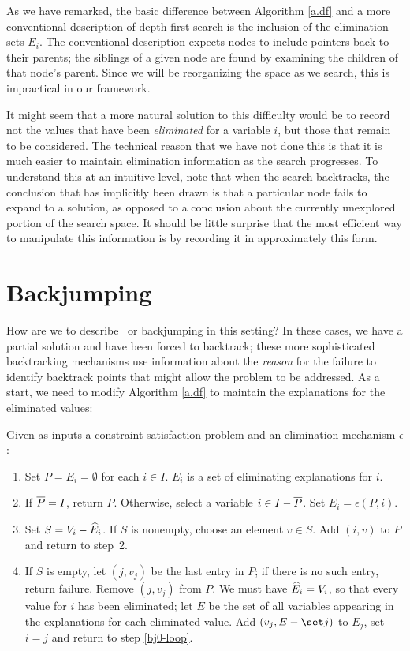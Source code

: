 As we have remarked, the basic difference between Algorithm \ref{a.df}
and a more conventional description of depth-first search is the
inclusion of the elimination sets $E_i$.  The conventional description
expects nodes to include pointers back to their parents; the siblings
of a given node are found by examining the children of that node's
parent.  Since we will be reorganizing the space as we search, this is
impractical in our framework.

It might seem that a more natural solution to this difficulty would be
to record not the values that have been {\em eliminated\/} for a
variable $i$, but those that remain to be considered.  The technical
reason that we have not done this is that it is much easier to
maintain elimination information as the search progresses.  To
understand this at an intuitive level, note that when the search
backtracks, the conclusion that has implicitly been drawn is that a
particular node fails to expand to a solution, as opposed to a
conclusion about the currently unexplored portion of the search space.
It should be little surprise that the most efficient way to manipulate
this information is by recording it in approximately this form.

\section{Backjumping}
\label{s.backjump}

How are we to describe \ddb\ or backjumping in this setting?  In these
cases, we have a partial solution and have been forced to backtrack;
these more sophisticated backtracking mechanisms use information about
the {\em reason\/} for the failure to identify backtrack points that
might allow the problem to be addressed.  As a start, we need to
modify Algorithm \ref{a.df} to maintain the explanations for the
eliminated values:

\begin{algorithm} Given as inputs a constraint-satisfaction problem
and an elimination mechanism $\epsilon$:
 \begin{enumerate} 
 \item Set $P=E_i=\emptyset$ for each $i\in I$.  $E_i$ is a set of
eliminating explanations for $i$.
 \item If $\overline P=I$, return $P$.  Otherwise, select a variable $i\in
I-\overline P$.  Set $E_i=\epsilon(P,i).$
 \item Set $S=V_i-\widehat E_i$.  If $S$ is nonempty, choose an element
$v\in S$.  Add $(i,v)$ to $P$ and return to step~2.  \label{bj0-loop}
 \item If $S$ is empty, let $(j,v_j)$ be the last entry in $P$; if
there is no such entry, return failure.  Remove $(j,v_j)$ from $P$.
We must have $\widehat E_i=V_i$, so that every value for $i$ has been
eliminated; let $E$ be the set of all variables appearing in the
explanations for each eliminated value.  Add $(v_j,E-\set j)$ to
$E_j$, set $i=j$ and return to step \ref{bj0-loop}.
\label{bj0-backtrack}
 \end{enumerate}
 \label{a.bj0}
 \end{algorithm}

